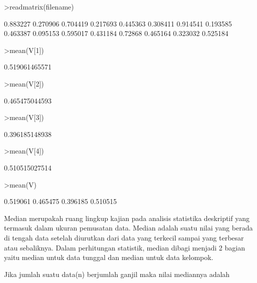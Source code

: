 \documentclass[a4paper,10pt]{article}
\begin{document}
\begin{eulernotebook}
\begin{euleroutput}
\end{euleroutput}
\begin{eulerprompt}
>readmatrix(filename)
\end{eulerprompt}
\begin{euleroutput}
       0.883227      0.270906      0.704419      0.217693 
       0.445363      0.308411      0.914541      0.193585 
       0.463387      0.095153      0.595017      0.431184 
        0.72868      0.465164      0.323032      0.525184 
\end{euleroutput}
\begin{eulerprompt}
>mean(V[1])
\end{eulerprompt}
\begin{euleroutput}
  0.519061465571
\end{euleroutput}
\begin{eulerprompt}
>mean(V[2])
\end{eulerprompt}
\begin{euleroutput}
  0.465475044593
\end{euleroutput}
\begin{eulerprompt}
>mean(V[3])
\end{eulerprompt}
\begin{euleroutput}
  0.396185148938
\end{euleroutput}
\begin{eulerprompt}
>mean(V[4])
\end{eulerprompt}
\begin{euleroutput}
  0.510515027514
\end{euleroutput}
\begin{eulerprompt}
>mean(V)
\end{eulerprompt}
\begin{euleroutput}
       0.519061 
       0.465475 
       0.396185 
       0.510515 
\end{euleroutput}
\begin{eulercomment}
Median merupakah ruang lingkup kajian pada analisis statistika
deskriptif yang termasuk dalam ukuran pemusatan data. Median adalah
suatu nilai yang berada di tengah data setelah diurutkan dari data
yang terkecil sampai yang terbesar atau sebaliknya. Dalam perhitungan
statistik, median dibagi menjadi 2 bagian yaitu median untuk data
tunggal dan median untuk data kelompok.\\
\end{eulercomment}
\begin{eulercomment}
Jika jumlah suatu data(n) berjumlah ganjil maka nilai mediannya adalah

\end{eulercomment}
\end{eulernotebook}
\end{document}

